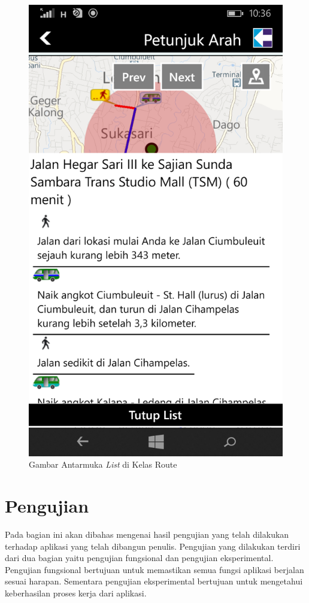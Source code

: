 	\begin{figure}[!h]
		\centering
			\includegraphics[scale=0.25]{Gambar/antarmuka/list_route}
		\caption{Gambar Antarmuka \textit{List} di Kelas Route}
		\label{fig:antarmuka list Route}
	\end{figure}

\newpage

\section{Pengujian}
\label{lab:Pengujian}
\hspace{0.5cm} Pada bagian ini akan dibahas mengenai hasil pengujian yang telah dilakukan terhadap aplikasi yang telah dibangun penulis. Pengujian yang dilakukan terdiri dari dua bagian yaitu pengujian fungsional dan pengujian eksperimental. Pengujian fungsional bertujuan untuk memastikan semua fungsi aplikasi berjalan sesuai harapan. Sementara pengujian eksperimental bertujuan untuk mengetahui keberhasilan proses kerja dari aplikasi.

